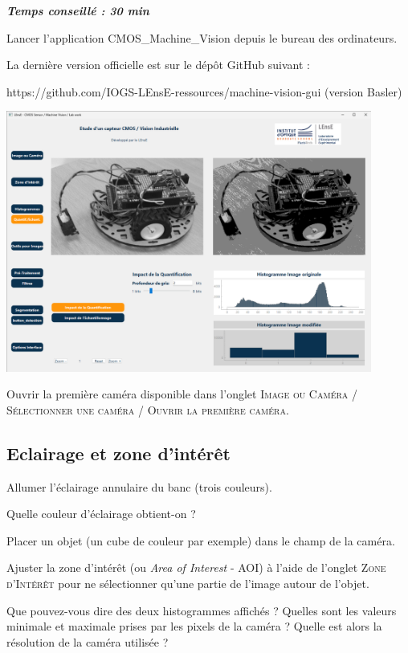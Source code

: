 \documentclass[a4paper,11pt,titlepage]{article} %
\begin{document}
\begin{center} \textbf{\textit{Temps conseillé : 30 min}} \end{center}

\Manip Lancer l'application CMOS\_Machine\_Vision depuis le bureau des ordinateurs.

La dernière version officielle est sur le dépôt GitHub suivant : 

https://github.com/IOGS-LEnsE-ressources/machine-vision-gui  (version Basler)


\begin{center}
	\includegraphics[width=0.9\textwidth]{./images/camera_gui.png}
\end{center}


\Manip Ouvrir la première caméra disponible dans l'onglet \textsc{Image ou Caméra} / \textsc{Sélectionner une caméra} / \textsc{Ouvrir la première caméra}.

\subsection{Eclairage et zone d'intérêt}

\Manip Allumer l'éclairage annulaire du banc (trois couleurs). 

\Quest Quelle couleur d'éclairage obtient-on ?

\Manip Placer un objet (un cube de couleur par exemple) dans le champ de la caméra.

\Manip Ajuster la zone d'intérêt (ou \textit{Area of Interest} - AOI) à l'aide de l'onglet \textsc{Zone d'Intérêt} pour ne sélectionner qu'une partie de l'image autour de l'objet.

\Quest Que pouvez-vous dire des deux histogrammes affichés ? Quelles sont les valeurs minimale et maximale prises par les pixels de la caméra ? Quelle est alors la résolution de la caméra utilisée ?
\end{document}
